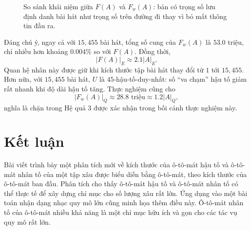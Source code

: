 \documentclass[11pt]{article}
\begin{document}
\begin{figure}[ht]
\centering
{}
\caption{So sánh khái niệm giữa \(F(A)\) và \(F_w(A)\): bản có trọng số lưu định danh bài hát như trọng số trên đường đi thay vì bỏ mất thông tin đầu ra.}
\end{figure}

Đáng chú ý, ngay cả với $15{,}455$ bài hát, tổng số cung của
$F_w(A)$ là $53.0$ triệu, chỉ nhiều hơn khoảng $0.004\%$ so với $F(A)$. Đồng
thời,
\[
  |F(A)|_E \approx 2.1|A|_E.
\]
Quan hệ nhân này được giữ khi kích thước tập bài hát thay đổi từ $1$ tới
$15{,}455$. Hơn nữa, với $15{,}455$ bài hát, $U$ là
$45$-hậu-tố-duy-nhất: số ``va chạm'' hậu tố giảm rất nhanh khi độ dài hậu tố
tăng. Thực nghiệm cũng cho
\[
  |F_w(A)|_Q \approx 28.8\text{ triệu} \approx 1.2|A|_Q,
\]
nghĩa là chặn trong Hệ quả 3 được xác nhận trong bối cảnh thực nghiệm này.

\section{Kết luận}

Bài viết trình bày một phân tích mới về kích thước của ô-tô-mát hậu tố và
ô-tô-mát nhân tố của một tập xâu được biểu diễn bằng ô-tô-mát, theo kích thước
của ô-tô-mát ban đầu. Phân tích cho thấy ô-tô-mát hậu tố và ô-tô-mát nhân tố
có thể thực tế để xây dựng chỉ mục cho số lượng xâu rất lớn. Ứng dụng vào một
bài toán nhận dạng nhạc quy mô lớn cũng minh họa thêm điều này. Ô-tô-mát nhân
tố của ô-tô-mát nhiều khả năng là một chỉ mục hữu ích và gọn cho các tác vụ
quy mô rất lớn.
\end{document}
